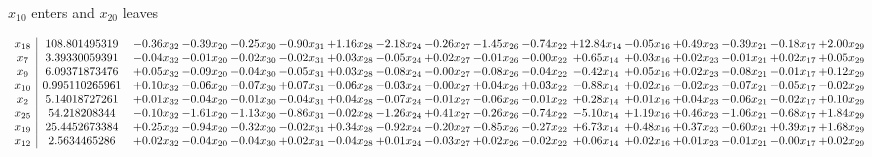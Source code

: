\documentclass[9pt]{article}
\begin{document}
 $ x_{10} $ enters and $ x_{20} $ leaves 

 \[\begin{array}{c| c c@{\hskip 2pt} c@{\hskip 2pt} c@{\hskip 2pt} c@{\hskip 2pt} c@{\hskip 2pt} c@{\hskip 2pt} c@{\hskip 2pt} c@{\hskip 2pt} c@{\hskip 2pt} c@{\hskip 2pt} c@{\hskip 2pt} c@{\hskip 2pt} c@{\hskip 2pt} c@{\hskip 2pt} c@{\hskip 2pt} }
 x_{18}   &  108.801495319 & -0.36 x_{32} & -0.39 x_{20} & -0.25 x_{30} & -0.90 x_{31} & +  1.16 x_{28} & -2.18 x_{24} & -0.26 x_{27} & -1.45 x_{26} & -0.74 x_{22} & + 12.84 x_{14} & -0.05 x_{16} & +  0.49 x_{23} & -0.39 x_{21} & -0.18 x_{17} & +  2.00 x_{29}\\
 x_{7}   &  3.39330059391 & -0.04 x_{32} & -0.01 x_{20} & -0.02 x_{30} & -0.02 x_{31} & +  0.03 x_{28} & -0.05 x_{24} & +  0.02 x_{27} & -0.01 x_{26} & -0.00 x_{22} & +  0.65 x_{14} & +  0.03 x_{16} & +  0.02 x_{23} & -0.01 x_{21} & +  0.02 x_{17} & +  0.05 x_{29}\\
 x_{9}   &  6.09371873476 & +  0.05 x_{32} & -0.09 x_{20} & -0.04 x_{30} & -0.05 x_{31} & +  0.03 x_{28} & -0.08 x_{24} & -0.00 x_{27} & -0.08 x_{26} & -0.04 x_{22} & -0.42 x_{14} & +  0.05 x_{16} & +  0.02 x_{23} & -0.08 x_{21} & -0.01 x_{17} & +  0.12 x_{29}\\
 x_{10}   &  0.995110265961 & +  0.10 x_{32} & -0.06 x_{20} & -0.07 x_{30} & +  0.07 x_{31} & -0.06 x_{28} & -0.03 x_{24} & -0.00 x_{27} & +  0.04 x_{26} & +  0.03 x_{22} & -0.88 x_{14} & +  0.02 x_{16} & -0.02 x_{23} & -0.07 x_{21} & -0.05 x_{17} & -0.02 x_{29}\\
 x_{2}   &  5.14018727261 & +  0.01 x_{32} & -0.04 x_{20} & -0.01 x_{30} & -0.04 x_{31} & +  0.04 x_{28} & -0.07 x_{24} & -0.01 x_{27} & -0.06 x_{26} & -0.01 x_{22} & +  0.28 x_{14} & +  0.01 x_{16} & +  0.04 x_{23} & -0.06 x_{21} & -0.02 x_{17} & +  0.10 x_{29}\\
 x_{25}   &  54.218208344 & -0.10 x_{32} & -1.61 x_{20} & -1.13 x_{30} & -0.86 x_{31} & -0.02 x_{28} & -1.26 x_{24} & +  0.41 x_{27} & -0.26 x_{26} & -0.74 x_{22} & -5.10 x_{14} & +  1.19 x_{16} & +  0.46 x_{23} & -1.06 x_{21} & -0.68 x_{17} & +  1.84 x_{29}\\
 x_{19}   &  25.4452673384 & +  0.25 x_{32} & -0.94 x_{20} & -0.32 x_{30} & -0.02 x_{31} & +  0.34 x_{28} & -0.92 x_{24} & -0.20 x_{27} & -0.85 x_{26} & -0.27 x_{22} & +  6.73 x_{14} & +  0.48 x_{16} & +  0.37 x_{23} & -0.60 x_{21} & +  0.39 x_{17} & +  1.68 x_{29}\\
 x_{12}   &  2.5634465286 & +  0.02 x_{32} & -0.04 x_{20} & -0.04 x_{30} & +  0.02 x_{31} & -0.04 x_{28} & +  0.01 x_{24} & -0.03 x_{27} & +  0.02 x_{26} & -0.02 x_{22} & +  0.06 x_{14} & +  0.02 x_{16} & +  0.01 x_{23} & -0.01 x_{21} & -0.00 x_{17} & +  0.02 x_{29}\\

\end{array}\]
\end{document}
